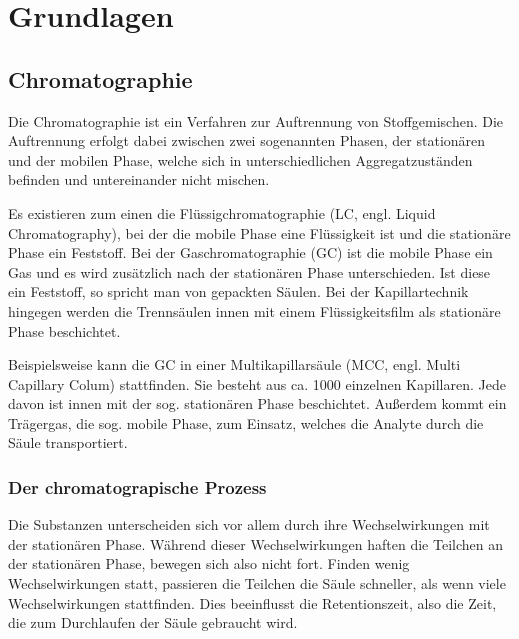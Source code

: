
\chapter{Grundlagen}
\label{chapter:gru}

\section{Chromatographie}

Die Chromatographie ist ein Verfahren zur Auftrennung von Stoffgemischen. 
Die Auftrennung erfolgt dabei zwischen zwei sogenannten Phasen, der stationären und der mobilen Phase, welche sich in unterschiedlichen Aggregatzuständen befinden und untereinander nicht mischen. 

Es existieren zum einen die Flüssigchromatographie (LC, engl. Liquid Chromatography),
bei der die mobile Phase eine Flüssigkeit ist und die stationäre Phase ein Feststoff. Bei der Gaschromatographie (GC) ist die mobile Phase ein Gas und es wird zusätzlich nach der stationären Phase unterschieden. Ist diese ein Feststoff, so spricht man von gepackten Säulen. Bei der Kapillartechnik hingegen werden die Trennsäulen innen mit einem Flüssigkeitsfilm als stationäre Phase beschichtet.



Beispielsweise kann die GC in einer Multikapillarsäule (MCC, engl. Multi Capillary Colum) stattfinden. Sie besteht aus ca. 1000  einzelnen Kapillaren. Jede davon ist innen mit der sog. stationären Phase beschichtet. Außerdem kommt ein Trägergas, die sog. mobile Phase, zum Einsatz, welches die Analyte durch die Säule transportiert. 

\subsection{Der chromatograpische Prozess}
Die Substanzen unterscheiden sich vor allem durch ihre Wechselwirkungen mit der stationären Phase. Während dieser Wechselwirkungen haften die Teilchen an der stationären Phase, bewegen sich also nicht fort. Finden wenig Wechselwirkungen statt, passieren die Teilchen die Säule schneller, als wenn viele Wechselwirkungen stattfinden. Dies beeinflusst die Retentionszeit, also die Zeit, die zum Durchlaufen der Säule gebraucht wird.

